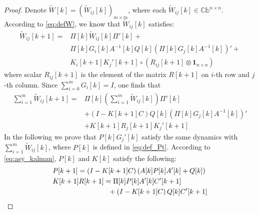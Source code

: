 \documentclass[12pt]{article}
\newtheorem*{proof}{\textbf{Proof}}
\begin{document}
\begin{proof}
Denote $\tilde{W}[k]=\left(\tilde{W}_{i j}[k]\right)_{m \times m}$, where each $\tilde{W}_{i j}[k] \in \mathbb{Cb}^{n \times n}$. According to \eqref{eq:defW}, we know that $\tilde{W}_{i j}[k]$ satisfies:
\begin{align*}
\tilde{W}_{i j}[k+1]= &\Pi[k] \tilde{W}_{i j}[k] \Pi{'}[k]+
\\
&\Pi[k]G_i[k]A^{-1}[k] Q[k] \left(\Pi[k]G_j[k]A^{-1}[k]\right){'}+
\\
&K_i[k+1]K_j{'}[k+1] \circ \left( R_{i j}[k+1]\otimes \mathbf{1}_{n\times n} \right)
\end{align*}
where scalar $R_{i j}[k+1]$ is the element of the matrix $R[k+1]$ on $i$-th row and $j$-th column. Since $\sum_{i=0}^{m}G_i[k]=I$, one finds that
\begin{align*}
\sum_{i=1}^{m} \tilde{W}_{i j}[k+1]=&\Pi[k] \left(\sum_{i=1}^{m} \tilde{W}_{i j}[k]\right) \Pi{'}[k]\\
& +\left(I-K[k+1]C\right)Q[k]\left(\Pi[k]G_j[k]A^{-1}[k]\right){'}\\
& + K[k+1]R_j[k+1]K_j{'}[k+1] 
\end{align*}
In the following we prove that $P[k]G_j{'}[k]$ satisfy the same dynamics with $\sum_{i=1}^{m}  \tilde{W}_{i j}[k]$, where $P[k]$ is defined in \eqref{eq:def_Pt}.
According to \eqref{eq:asy_kalman}, $P[k]$ and $K[k]$ satisfy the following:
\begin{align}
&P[k+1]=\left(I-K[k+1]C\right) \left(A[k]P[k]A{'}[k] +Q[k]\right) \notag \\
&K[k+1]R[k+1]=\Pi[k]P[k]A{'}[k]C{'}[k+1] \notag \\
&\hspace{80pt}+\left(I-K[k+1]C\right)Q[k]C{'}[k+1] \label{eq:KR}
\end{align}


\end{proof}
\end{document}
